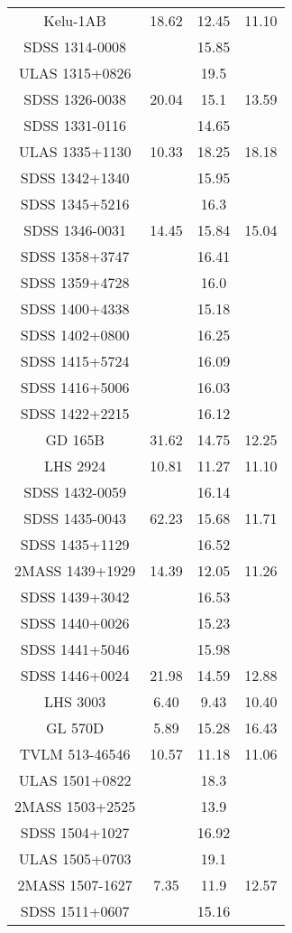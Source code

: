 \begin{table}
\begin{tabular}{cccc}
Kelu-1AB & 18.62 & 12.45 & 11.10 \\
SDSS 1314-0008 &  & 15.85 &  \\
ULAS 1315+0826 &  & 19.5 &  \\
SDSS 1326-0038 & 20.04 & 15.1 & 13.59 \\
SDSS 1331-0116 &  & 14.65 &  \\
ULAS 1335+1130 & 10.33 & 18.25 & 18.18 \\
SDSS 1342+1340 &  & 15.95 &  \\
SDSS 1345+5216 &  & 16.3 &  \\
SDSS 1346-0031 & 14.45 & 15.84 & 15.04 \\
SDSS 1358+3747 &  & 16.41 &  \\
SDSS 1359+4728 &  & 16.0 &  \\
SDSS 1400+4338 &  & 15.18 &  \\
SDSS 1402+0800 &  & 16.25 &  \\
SDSS 1415+5724 &  & 16.09 &  \\
SDSS 1416+5006 &  & 16.03 &  \\
SDSS 1422+2215 &  & 16.12 &  \\
GD 165B & 31.62 & 14.75 & 12.25 \\
LHS 2924 & 10.81 & 11.27 & 11.10 \\
SDSS 1432-0059 &  & 16.14 &  \\
SDSS 1435-0043 & 62.23 & 15.68 & 11.71 \\
SDSS 1435+1129 &  & 16.52 &  \\
2MASS 1439+1929 & 14.39 & 12.05 & 11.26 \\
SDSS 1439+3042 &  & 16.53 &  \\
SDSS 1440+0026 &  & 15.23 &  \\
SDSS 1441+5046 &  & 15.98 &  \\
SDSS 1446+0024 & 21.98 & 14.59 & 12.88 \\
LHS 3003 & 6.40 & 9.43 & 10.40 \\
GL 570D & 5.89 & 15.28 & 16.43 \\
TVLM 513-46546 & 10.57 & 11.18 & 11.06 \\
ULAS 1501+0822 &  & 18.3 &  \\
2MASS 1503+2525 &  & 13.9 &  \\
SDSS 1504+1027 &  & 16.92 &  \\
ULAS 1505+0703 &  & 19.1 &  \\
2MASS 1507-1627 & 7.35 & 11.9 & 12.57 \\
SDSS 1511+0607 &  & 15.16 &  \\

\end{tabular}
\end{table}
